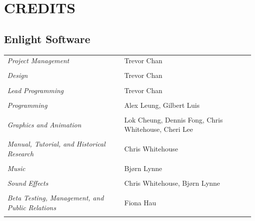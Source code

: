 
\chapter[Credits]{{\Huge C}REDITS}

\section{Enlight Software}

\begin{tabular}{p{2in} p{2in}}
    \textit{Project Management} & Trevor Chan \\ \\
    \textit{Design} & Trevor Chan \\ \\
    \textit{Lead Programming} & Trevor Chan \\ \\
    \textit{Programming} & Alex Leung, Gilbert Luis \\ \\
    \textit{Graphics and Animation} & Lok Cheung, Dennis Fong, Chris Whitehouse, Cheri Lee \\ \\
    \textit{Manual, Tutorial, and Historical Research} & Chris Whitehouse \\ \\
    \textit{Music} & Bjørn Lynne \\ \\
    \textit{Sound Effects} & Chris Whitehouse, Bjørn Lynne \\ \\
    \textit{Beta Testing, Management, and Public Relations} & Fiona Hau \\ \\
\end{tabular}

